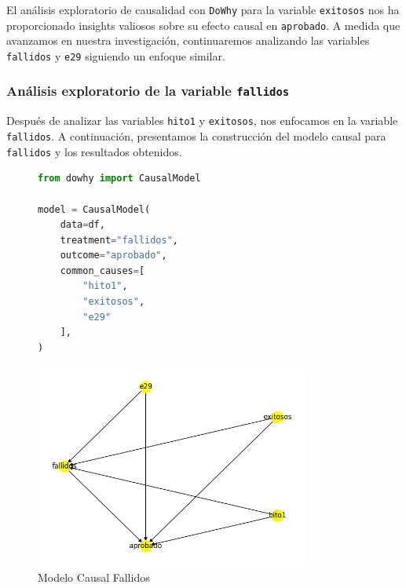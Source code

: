 El análisis exploratorio de causalidad con \texttt{DoWhy} para la variable \texttt{exitosos} nos ha proporcionado insights valiosos sobre su efecto causal en \texttt{aprobado}. A medida que avanzamos en nuestra investigación, continuaremos analizando las variables \texttt{fallidos} y \texttt{e29} siguiendo un enfoque similar.

\subsubsection{Análisis exploratorio de la variable \texttt{fallidos}}

Después de analizar las variables \texttt{hito1} y \texttt{exitosos}, nos enfocamos en la variable \texttt{fallidos}. A continuación, presentamos la construcción del modelo causal para \texttt{fallidos} y los resultados obtenidos.

\begin{figure}[H]
    \centering
    \begin{minipage}{0.48\textwidth}
        \begin{lstlisting}[language=Python, caption=Modelo causal fallidos, label=lst:model_causalFallidos]
from dowhy import CausalModel

model = CausalModel(
    data=df,
    treatment="fallidos",
    outcome="aprobado",
    common_causes=[
        "hito1",
        "exitosos",
        "e29"
    ],
)
        \end{lstlisting}
    \end{minipage}
    \hfill
    \begin{minipage}{0.48\textwidth}
        \centering
        \includegraphics[width=0.8\textwidth]{img/causalidad/graph_causal_model_fallidos.png}
        \caption{Modelo Causal Fallidos}
        \label{fig:modelo_causal_Fallidos}
    \end{minipage}
\end{figure}

